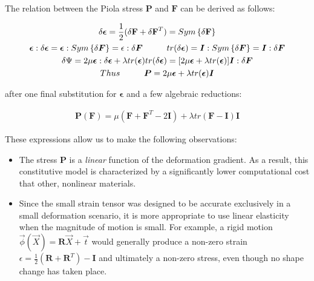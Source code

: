 The relation between the Piola stress $\mathbf{P}$ and $\mathbf{F}$ can be derived as follows:

\begin{gather*}
\delta \boldsymbol{\epsilon} =\frac{1}{2}(\delta\mathbf{F} + \delta\mathbf{F}^T)=Sym\left\{\delta\mathbf{F}\right\}  \\
\boldsymbol{\epsilon}:\delta\boldsymbol{\epsilon}=\boldsymbol{\epsilon}:Sym\left\{\delta\boldsymbol{F}\right\}=\epsilon:\delta\boldsymbol{F} \hspace{10 mm}
tr(\delta\boldsymbol{\epsilon})=\boldsymbol{I}:Sym\left\{\delta\boldsymbol{F}\right\}=\boldsymbol{I}:\delta\boldsymbol{F} \\
\delta\Psi=2\mu\boldsymbol{\epsilon}:\delta\boldsymbol{\epsilon}+\lambda tr(\boldsymbol{\epsilon})  tr(\delta\boldsymbol{\epsilon})=[2\mu\boldsymbol{\epsilon}+\lambda tr(\boldsymbol{\epsilon})]\boldsymbol{I}:\delta\boldsymbol{F}\\
Thus \hspace{10 mm} \boldsymbol{P}=2\mu\boldsymbol{\epsilon}+\lambda tr(\boldsymbol{\epsilon})\boldsymbol{I}
\end{gather*}

after one final substitution for $\boldsymbol{\epsilon}$ and a few algebraic reductions:

\begin{align*}
  \boldsymbol{P}(\boldsymbol{F})=\mu(\boldsymbol{F} + \boldsymbol{F}^T-2\boldsymbol{I})+\lambda tr(\boldsymbol{F} - \boldsymbol{I})\boldsymbol{I}
\end{align*}

These expressions allow us to make the following observations:

\begin{itemize}
 \item The stress $\boldsymbol{P}$ is a \textit{linear} function of the deformation gradient. As a result, this constitutive model is characterized by a significantly
lower computational cost that other, nonlinear materials. 

\item Since the small strain tensor was designed to be accurate exclusively in a small deformation scenario, it is more appropriate to use linear elasticity when the magnitude
of motion is small. For example, a rigid motion $\vec{\phi}(\vec{X})=\boldsymbol{R}\vec{X}+\vec{t}$ would generally produce a non-zero strain 
$\epsilon = \frac{1}{2}(\boldsymbol{R}+\boldsymbol{R}^T)-\boldsymbol{I}$ and ultimately a non-zero stress, even though no shape change has taken place. 
\end{itemize}

